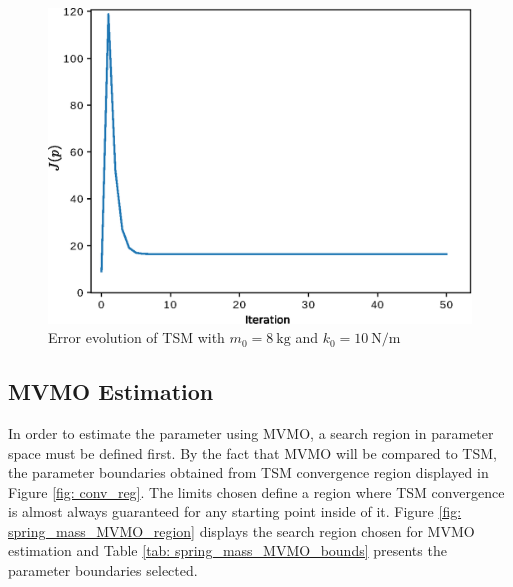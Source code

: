 \begin{figure}[h]
	\caption{Error evolution of TSM with $m_{0} = 8\ \text{kg}$ and $k_{0} = 10\ \text{N/m}$}
	\begin{center}
		\includegraphics[scale=0.6]{Images/TS_nconv.eps}
	\end{center}
	\label{fig: TS_nconv}
\end{figure}

\subsection{MVMO Estimation}

In order to estimate the parameter using MVMO, a search region in parameter space must be defined first. By the fact that MVMO will be compared to TSM, the parameter boundaries obtained from TSM convergence region displayed in Figure \ref{fig: conv_reg}. The limits chosen define a region where TSM convergence is almost always guaranteed for any starting point inside of it. Figure \ref{fig: spring_mass_MVMO_region} displays the search region chosen for MVMO estimation and Table \ref{tab: spring_mass_MVMO_bounds} presents the parameter boundaries selected.

